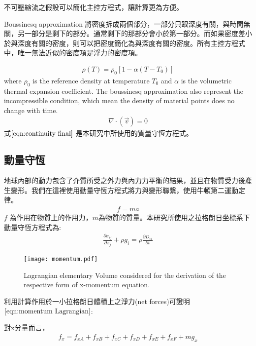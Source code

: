 不可壓縮流之假設可以簡化主控方程式，讓計算更為方便。

Boussinesq approximation 將密度拆成兩個部分，一部分只跟深度有關，與時間無關，另一部分是剩下的部分。通常剩下的那部分會小於第一部分。而如果密度差小於與深度有關的密度，則可以把密度簡化為與深度有關的密度。所有主控方程式中，唯一無法近似的密度項是浮力的密度項。

\begin{align}
\rho (T) = \rho_0[1-\alpha (T-T_0)] 
\end{align}
where $\rho_0$ is the reference density at temperature $T_0$ and $\alpha$ is the volumetric thermal expansion coefficient. The boussinesq approximation also represent the incompressible condition, which mean the density of material points does no change with time. 
\begin{align}
\nabla \cdot (\vec v) = 0 \label{eqn:continuity final}
\end{align}
式$\ref{eqn:continuity final}$ 是本研究中所使用的質量守恆方程式。

\subsection{動量守恆}


地球內部的動力包含了介質所受之外力與內力力平衡的結果，並且在物質受力後產生變形。我們在這裡使用動量守恆方程式將力與變形聯繫，使用牛頓第二運動定律。
\begin{align}
f=ma
\end{align}
$f$ 為作用在物質上的作用力，$m$為物質的質量。本研究所使用之拉格朗日坐標系下動量守恆方程式為:
\begin{align}
\frac{\partial \sigma_{ij}}{\partial x_j}+\rho g_i = \rho \frac{\partial D_{vi}}{\partial t}\label{eqn:momentum Lagrangian}
\end{align}
\begin{figure*}[ht!]
    \centering
    \texttt{[image: momentum.pdf]}
    \caption{ Lagrangian elementary Volume considered for the derivation of the respective form of x-momentum equation.}
    \label{fig::Lagrangian Volume}
\end{figure*}
利用計算作用於一小拉格朗日體積上之淨力(net forces)可證明$\ref{eqn:momentum Lagrangian}$:

對x分量而言，
\begin{align}
f_x=f_{xA}+f_{xB}+f_{xC}+f_{xD}+f_{xE}+f_{xF}+mg_x \label{eqn:Ftotal0}
\end{align}

